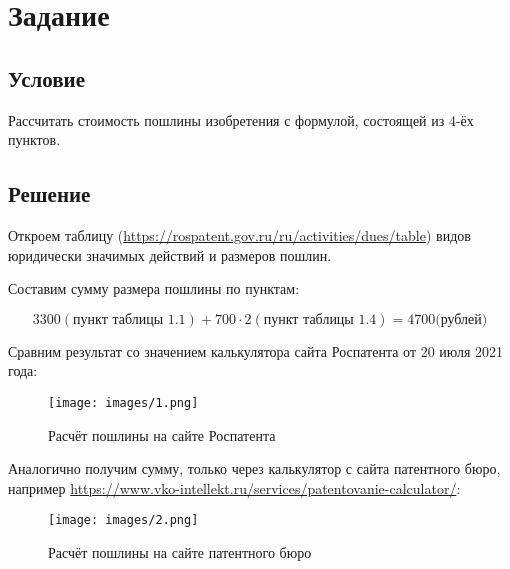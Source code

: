 \documentclass[12pt]{article}
\begin{document}
    \section*{Задание}

    \subsection*{Условие}

    Рассчитать стоимость пошлины изобретения с формулой, состоящей из 4-ёх пунктов.

    \subsection*{Решение}

    Откроем таблицу (\href{https://rospatent.gov.ru/ru/activities/dues/table}{https://rospatent.gov.ru/ru/activities/dues/table}) видов юридически значимых действий и размеров пошлин.

    Составим сумму размера пошлины по пунктам:

    $$ 3300 (\text{пункт таблицы 1.1}) + 700 \cdot 2 (\text{пункт таблицы 1.4}) = 4700 (\text{рублей)} $$

    Сравним результат со значением калькулятора сайта Роспатента от 20 июля 2021 года:
    \begin{figure}[ht]
        \centering
        \texttt{[image: images/1.png]}
        \caption{Расчёт пошлины на сайте Роспатента}
        \label{fig:o:3}
    \end{figure}

    \newpage

    Аналогично получим сумму, только через калькулятор с сайта патентного бюро, например \href{https://www.vko-intellekt.ru/services/patentovanie-calculator/}{https://www.vko-intellekt.ru/services/patentovanie-calculator/}:
    \begin{figure}[ht]
        \centering
        \texttt{[image: images/2.png]}
        \caption{Расчёт пошлины на сайте патентного бюро}
        \label{fig:o:3}
    \end{figure}
\end{document}
